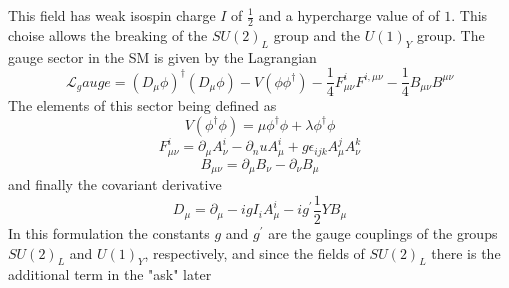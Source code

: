 \documentclass[11pt,twoside,a4paper]{article}
\begin{document}
This field has weak isospin charge $I$ of $\frac{1}{2}$ and a hypercharge value of of $1$. This choise allows the breaking of the $SU(2)_L$ group and the $U(1)_Y$ group. The gauge sector in the SM is given by the Lagrangian
\begin{equation}
\mathcal{L}_gauge = (D_\mu \phi)^\dagger (D_\mu \phi) - V (\phi \phi^\dagger) - \frac{1}{4} F^i_{\mu \nu} F^{i , \mu \nu} - \frac{1}{4} B_{\mu \nu} B^{\mu \nu}
\end{equation} 
The elements of this sector being defined as 
\begin{equation}
V(\phi^\dagger \phi ) = \mu \phi^\dagger \phi + \lambda \phi^\dagger \phi
\end{equation}
\begin{equation}
 F^i_{\mu \nu}= \partial_\mu A^i_\nu - \partial_nu A^i_\mu + g \epsilon_{ijk} A^j_\mu A^k_\nu 
\end{equation}
\begin{equation}
B_{\mu \nu} = \partial_\mu B_\nu - \partial_\nu B_\mu 
\end{equation}
and finally the covariant derivative 
\begin{equation}
D_\mu = \partial_\mu - ig I_i A^i_\mu - ig^\prime \frac{1}{2} Y B_\mu 
\end{equation}
In this formulation the constants $g$ and $g^\prime$ are the gauge couplings of the groups $SU(2)_L$ and $U(1)_Y$, respectively, and since the fields of $SU(2)_L$ there is the additional term in the "ask" later 
 
\end{document}
